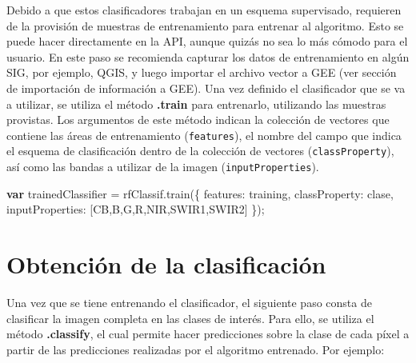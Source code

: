 \documentclass[
  12pt,
  letterpaper,
  twoside]{book}
\newenvironment{Shaded}{\begin{snugshade}}{\end{snugshade}}
\newcommand{\DataTypeTok}[1]{\textcolor[rgb]{0.00,0.00,0.00}{#1}}
\newcommand{\FunctionTok}[1]{\textcolor[rgb]{0.48,0.12,0.64}{#1}}
\newcommand{\KeywordTok}[1]{\textcolor[rgb]{0.00,0.00,0.00}{\textbf{#1}}}
\newcommand{\NormalTok}[1]{#1}
\newcommand{\OperatorTok}[1]{\textcolor[rgb]{0.00,0.00,0.00}{#1}}
\newcommand{\StringTok}[1]{\textcolor[rgb]{0.87,0.29,0.22}{#1}}
\newcommand\boldpurple[1]{\textcolor{darkpurple}{\textbf{#1}}}
\begin{document}
Debido a que estos clasificadores trabajan en un esquema supervisado, requieren de la provisión de muestras de entrenamiento para entrenar al algoritmo. Esto se puede hacer directamente en la API, aunque quizás no sea lo más cómodo para el usuario. En este paso se recomienda capturar los datos de entrenamiento en algún SIG, por ejemplo, QGIS, y luego importar el archivo vector a GEE (ver sección de importación de información a GEE). Una vez definido el clasificador que se va a utilizar, se utiliza el método \boldpurple{.train} para entrenarlo, utilizando las muestras provistas. Los argumentos de este método indican la colección de vectores que contiene las áreas de entrenamiento (\texttt{features}), el nombre del campo que indica el esquema de clasificación dentro de la colección de vectores (\texttt{classProperty}), así como las bandas a utilizar de la imagen (\texttt{inputProperties}).

\begin{Shaded}
\begin{Highlighting}[]
\KeywordTok{var}\NormalTok{ trainedClassifier }\OperatorTok{=}\NormalTok{ rfClassif}\OperatorTok{.}\FunctionTok{train}\NormalTok{(\{}
  \DataTypeTok{features}\OperatorTok{:}\NormalTok{ training}\OperatorTok{,}
  \DataTypeTok{classProperty}\OperatorTok{:} \StringTok{\textquotesingle{}clase\textquotesingle{}}\OperatorTok{,}
  \DataTypeTok{inputProperties}\OperatorTok{:}\NormalTok{ [}\StringTok{\textquotesingle{}CB\textquotesingle{}}\OperatorTok{,}\StringTok{\textquotesingle{}B\textquotesingle{}}\OperatorTok{,}\StringTok{\textquotesingle{}G\textquotesingle{}}\OperatorTok{,}\StringTok{\textquotesingle{}R\textquotesingle{}}\OperatorTok{,}\StringTok{\textquotesingle{}NIR\textquotesingle{}}\OperatorTok{,}\StringTok{\textquotesingle{}SWIR1\textquotesingle{}}\OperatorTok{,}\StringTok{\textquotesingle{}SWIR2\textquotesingle{}}\NormalTok{]}
\NormalTok{\})}\OperatorTok{;}
\end{Highlighting}
\end{Shaded}

\hypertarget{obtenciuxf3n-de-la-clasificaciuxf3n}{%
\section{Obtención de la clasificación}\label{obtenciuxf3n-de-la-clasificaciuxf3n}}

Una vez que se tiene entrenando el clasificador, el siguiente paso consta de clasificar la imagen completa en las clases de interés. Para ello, se utiliza el método \boldpurple{.classify}, el cual permite hacer predicciones sobre la clase de cada píxel a partir de las predicciones realizadas por el algoritmo entrenado. Por ejemplo:
\end{document}
